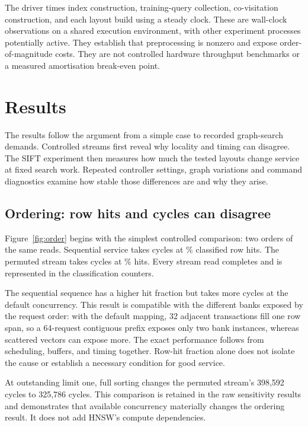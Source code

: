 \documentclass[11pt,a4paper]{report}
\begin{document}
The driver times index construction, training-query collection, co-visitation construction, and each layout build using a steady clock. These are wall-clock observations on a shared execution environment, with other experiment processes potentially active. They establish that preprocessing is nonzero and expose order-of-magnitude costs. They are not controlled hardware throughput benchmarks or a measured amortisation break-even point.





\chapter{Results}
\label{ch:results}
The results follow the argument from a simple case to recorded graph-search demands. Controlled streams first reveal why locality and timing can disagree. The SIFT experiment then measures how much the tested layouts change service at fixed search work. Repeated controller settings, graph variations and command diagnostics examine how stable those differences are and why they arise.
\section{Ordering: row hits and cycles can disagree}
Figure~\ref{fig:order} begins with the simplest controlled comparison: two orders of the same reads. Sequential service takes \SequentialCycles{} cycles at \SequentialHit\% classified row hits. The permuted stream takes \RandomCycles{} cycles at \RandomHit\% hits. Every stream read completes and is represented in the classification counters.

The sequential sequence has a higher hit fraction but takes more cycles at the default concurrency. This result is compatible with the different banks exposed by the request order: with the default mapping, 32 adjacent transactions fill one row span, so a 64-request contiguous prefix exposes only two bank instances, whereas scattered vectors can expose more. The exact performance follows from scheduling, buffers, and timing together. Row-hit fraction alone does not isolate the cause or establish a necessary condition for good service.

At outstanding limit one, full sorting changes the permuted stream's 398,592 cycles to 325,786 cycles. This comparison is retained in the raw sensitivity results and demonstrates that available concurrency materially changes the ordering result. It does not add HNSW's compute dependencies.
\end{document}
